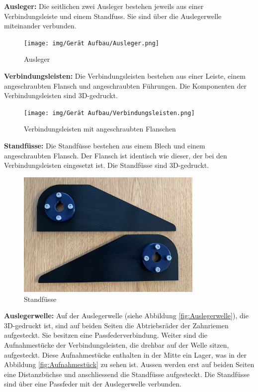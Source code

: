 \newpage

\textbf{Ausleger:} Die seitlichen zwei Ausleger bestehen jeweils aus einer Verbindungsleiste und einem Standfuss. Sie sind über die Auslegerwelle miteinander verbunden.

\begin{figure}[H]
  \texttt{[image: img/Gerät Aufbau/Ausleger.png]}
  \centering
  \caption{Ausleger}
  \label{fig:Ausleger}
\end{figure}

\textbf{Verbindungsleisten:} Die Verbindungsleisten bestehen aus einer Leiste, einem angeschraubten Flansch und angeschraubten Führungen. Die Komponenten der Verbindungsleisten sind 3D-gedruckt.

\begin{figure}[H]
  \texttt{[image: img/Gerät Aufbau/Verbindungsleisten.png]}
  \centering
  \caption{Verbindungsleisten mit angeschraubten Flanschen}
  \label{fig:Verbindungsleisten}
\end{figure}

\textbf{Standfüsse:} Die Standfüsse bestehen aus einem Blech und einem angeschraubten Flansch. Der Flansch ist identisch wie dieser, der bei den Verbindungsleisten eingesetzt ist. Die Standfüsse sind 3D-gedruckt.

\begin{figure}[H]
  \includegraphics[width=0.8\textwidth]{img/Gerät Aufbau/Standfüsse.png}
  \centering
  \caption{Standfüsse}
  \label{fig:Standfüsse}
\end{figure}

\newpage

\textbf{Auslegerwelle:} Auf der Auslegerwelle (siehe Abbildung \ref{fig:Auslegerwelle}), die 3D-gedruckt ist, sind auf beiden Seiten die Abtriebsräder der Zahnriemen aufgesteckt. Sie besitzen eine Passfederverbindung. Weiter sind die Aufnahmestücke der Verbindungsleisten, die drehbar auf der Welle sitzen, aufgesteckt. Diese Aufnahmestücke enthalten in der Mitte ein Lager, was in der Abbildung \ref{fig:Aufnahmestück} zu sehen ist. Aussen werden erst auf beiden Seiten eine Distanzbüchse und anschliessend die Standfüsse aufgesteckt. Die Standfüsse sind über eine Passfeder mit der Auslegerwelle verbunden.

